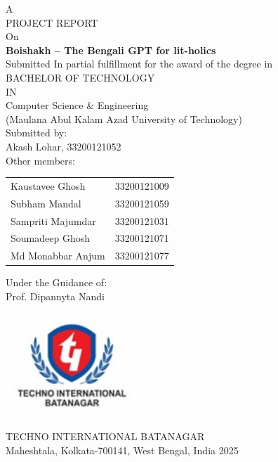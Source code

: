 \begin{titlepage}
    \begin{center}
        \vspace*{0.5cm}
        
        
        \vspace{0.5cm}
        {\large A}\\[0.3cm]
        {\large PROJECT REPORT}\\[0.3cm]
        {\large On}\\[0.5cm]
        
        {\LARGE\textbf{Boishakh -- The Bengali GPT for lit-holics}}\\[1cm]
        
        {\large Submitted In partial fulfillment for the award of the degree in}\\[0.7cm]
        
        {\Large BACHELOR OF TECHNOLOGY}\\[0.3cm]
        {\large IN}\\[0.3cm]
        {\large Computer Science \& Engineering}\\[0.3cm]
        
        {\large (Maulana Abul Kalam Azad University of Technology)}\\[1cm]
        
        {\large Submitted by:}\\[0.5cm]

        Akash Lohar, 33200121052\\[0.3cm]

        {\large Other members:}\\[0.5cm]
        \begin{tabular}{ll}
            Kaustavee Ghosh & 33200121009\\
            Subham Mandal & 33200121059\\
            Sampriti Majumdar & 33200121031\\
            Soumadeep Ghosh & 33200121071\\
            Md Monabbar Anjum & 33200121077
        \end{tabular}
        
        \vfill
        
        {\large Under the Guidance of:}\\[0.3cm]
        {\large Prof. Dipannyta Nandi}

        \includegraphics[width=5cm]{university-logo.jpeg}

        {\Large TECHNO INTERNATIONAL BATANAGAR}\\[0.3cm]
        {\large Maheshtala, Kolkata-700141, West Bengal, India 2025}\\[1cm]
        
    \end{center}
\end{titlepage}
